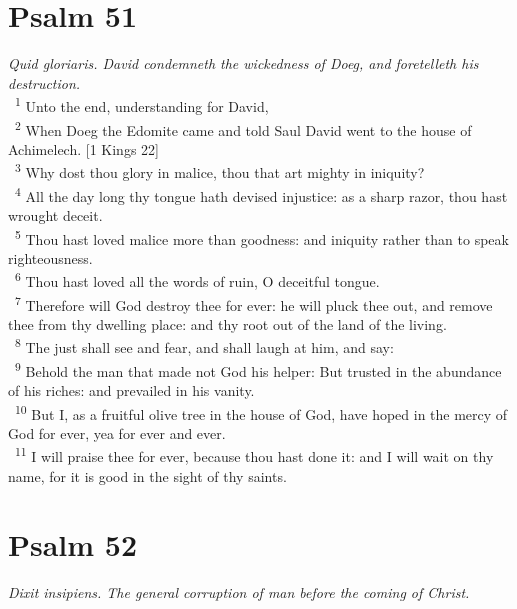 \documentclass[a5paper,12pt]{article}
\begin{document}
\begin{multicols*}{2}
\section{Psalm 51}
\label{sec:org86a30ea}
\emph{Quid gloriaris. David condemneth the wickedness of Doeg, and foretelleth his destruction.}\\

~\textsuperscript{1} Unto the end, understanding for David,\\
~\textsuperscript{2} When Doeg the Edomite came and told Saul David went to the house of Achimelech. [1 Kings 22]\\
~\textsuperscript{3} Why dost thou glory in malice, thou that art mighty in iniquity?\\
~\textsuperscript{4} All the day long thy tongue hath devised injustice: as a sharp razor, thou hast wrought deceit.\\
~\textsuperscript{5} Thou hast loved malice more than goodness: and iniquity rather than to speak righteousness.\\
~\textsuperscript{6} Thou hast loved all the words of ruin, O deceitful tongue.\\
~\textsuperscript{7} Therefore will God destroy thee for ever: he will pluck thee out, and remove thee from thy dwelling place: and thy root out of the land of the living.\\
~\textsuperscript{8} The just shall see and fear, and shall laugh at him, and say:\\
~\textsuperscript{9} Behold the man that made not God his helper: But trusted in the abundance of his riches: and prevailed in his vanity.\\
~\textsuperscript{10} But I, as a fruitful olive tree in the house of God, have hoped in the mercy of God for ever, yea for ever and ever.\\
~\textsuperscript{11} I will praise thee for ever, because thou hast done it: and I will wait on thy name, for it is good in the sight of thy saints.\\

\section{Psalm 52}
\label{sec:org47b648e}
\emph{Dixit insipiens. The general corruption of man before the coming of Christ.}\\


\end{multicols*}
\end{document}
